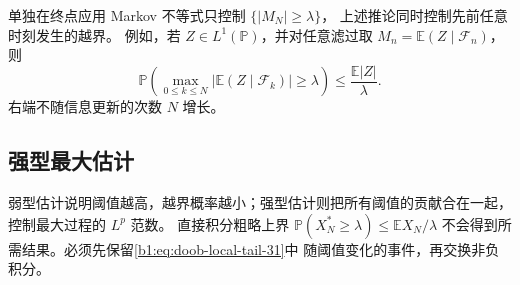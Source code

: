 单独在终点应用 Markov 不等式只控制 \(\{|M_N|\geq\lambda\}\)，
上述推论同时控制先前任意时刻发生的越界。
例如，若 \(Z\in L^1(\mathbb P)\)，并对任意滤过取
\(M_n=\mathbb E(Z\mid\mathcal F_n)\)，则
\[
 \mathbb P\left(\max_{0\leq k\leq N}
       |\mathbb E(Z\mid\mathcal F_k)|\geq\lambda\right)
 \leq\frac{\mathbb E|Z|}{\lambda}.
\]
右端不随信息更新的次数 \(N\) 增长。

\subsection{强型最大估计}
\label{b1:subsec:310403}

弱型估计说明阈值越高，越界概率越小；强型估计则把所有阈值的贡献合在一起，
控制最大过程的 \(L^p\) 范数。
直接积分粗略上界 \(\mathbb P(X_N^*\geq\lambda)\leq\mathbb E X_N/\lambda\)
不会得到所需结果。必须先保留\eqref{b1:eq:doob-local-tail-31}中
随阈值变化的事件，再交换非负积分。

